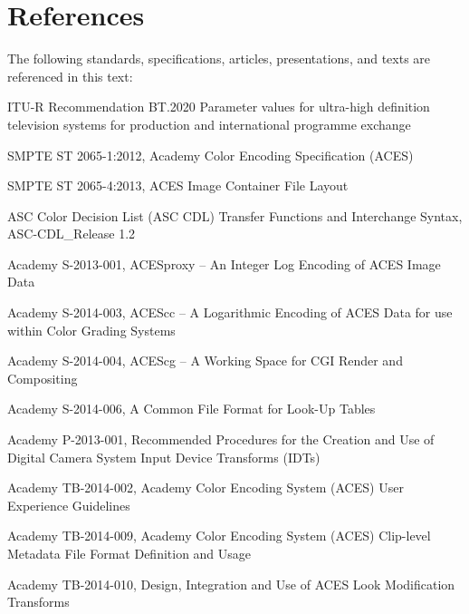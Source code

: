 \numberedformat
\chapter{References}
The following standards, specifications, articles, presentations, and texts are referenced in this text:

ITU-R Recommendation BT.2020 Parameter values for ultra-high definition television systems for production and international programme exchange

SMPTE ST 2065-1:2012, Academy Color Encoding Specification (ACES)

SMPTE ST 2065-4:2013, ACES Image Container File Layout

ASC Color Decision List (ASC CDL) Transfer Functions and Interchange Syntax, ASC-CDL\_Release 1.2

Academy S-2013-001, ACESproxy -- An Integer Log Encoding of ACES Image Data

Academy S-2014-003, ACEScc -- A Logarithmic Encoding of ACES Data for use within Color Grading Systems

Academy S-2014-004, ACEScg -- A Working Space for CGI Render and Compositing

Academy S-2014-006, A Common File Format for Look-Up Tables

Academy P-2013-001, Recommended Procedures for the Creation and Use of Digital Camera System Input Device Transforms (IDTs)

Academy TB-2014-002, Academy Color Encoding System (ACES) User Experience Guidelines

Academy TB-2014-009, Academy Color Encoding System (ACES) Clip-level Metadata File Format Definition and Usage

Academy TB-2014-010, Design, Integration and Use of ACES Look Modification Transforms